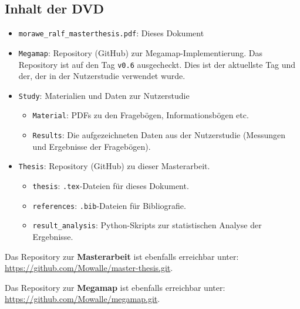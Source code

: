 \begin{appendices}
    \chapter{Inhalt der DVD}
    \begin{itemize}
        \item \texttt{morawe\_ralf\_masterthesis.pdf}: Dieses Dokument
        
        \item \texttt{Megamap}: Repository (GitHub) zur Megamap-Implementierung. %
        Das Repository ist auf den Tag \texttt{v0.6} ausgecheckt. %
        Dies ist der aktuellste Tag und der, der in der Nutzerstudie verwendet wurde.
        
        \item \texttt{Study}: Materialien und Daten zur Nutzerstudie
        \begin{itemize}
            \item \texttt{Material}: PDFs zu den Fragebögen, Informationsbögen etc.
            
            \item \texttt{Results}: Die aufgezeichneten Daten aus der Nutzerstudie (Messungen und Ergebnisse der Fragebögen).
        \end{itemize}
    
        \item \texttt{Thesis}: Repository (GitHub) zu dieser Masterarbeit.
        \begin{itemize}
            \item \texttt{thesis}: \texttt{.tex}-Dateien für dieses Dokument.
            
            \item \texttt{references}: \texttt{.bib}-Dateien für Bibliografie.
            
            \item \texttt{result\_analysis}: Python-Skripts zur statistischen Analyse der Ergebnisse.
        \end{itemize}
    \end{itemize}
    
    \noindent
    Das Repository zur \textbf{Masterarbeit} ist ebenfalls erreichbar unter:\\
    \url{https://github.com/Mowalle/master-thesis.git}.
    
    \vspace{1em}
    \noindent
    Das Repository zur \textbf{Megamap} ist ebenfalls erreichbar unter:\\
    \url{https://github.com/Mowalle/megamap.git}.
    
    
\end{appendices}